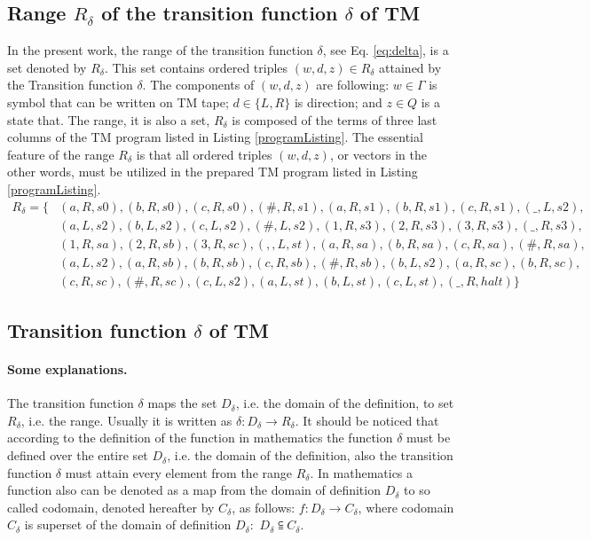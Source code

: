 \documentclass[12pt, a4paper, bibliography=totocnumbered]{report}
\begin{document}
	\subsection{Range $ R_{\delta} $ of the transition function $ \delta $ of TM}
	In the present work, the range of the transition function $ \delta $, see Eq. \ref{eq:delta}, is a set denoted by $ R_{\delta} $. This set contains ordered triples $ (w, d, z) \in R_{\delta} $ attained by the Transition function $ \delta $. The components of $ (w, d, z) $ are following: $ w \in \Gamma $ is symbol that can be written on TM tape; $ d \in \{L, R\} $ is direction; and $ z \in Q $ is a state that.
	The range, it is also a set, $ R_{\delta} $ is composed of the terms of three last columns of the TM program listed in Listing \ref{programListing}. The essential feature of the range $ R_{\delta} $ is that all ordered triples $ (w, d, z) $, or vectors in the other words, must be utilized in the prepared TM program listed in Listing \ref{programListing}.
	\begin{equation}
	\label{eq:range}
	\begin{aligned}
	R_{\delta} = \{ & (a, R, s0), (b, R, s0), (c, R, s0), (\#, R, s1), (a, R, s1), (b, R, s1), (c, R, s1), (\_, L, s2), \\
		   & (a, L, s2), (b, L, s2), (c, L, s2), (\#, L, s2), (1, R, s3), (2, R, s3), (3, R, s3), (\_, R, s3), \\
		   & (1, R, sa), (2, R, sb), (3, R, sc), (,, L, st), (a, R, sa), (b, R, sa), (c, R, sa), (\#, R, sa),  \\
		   & (a, L, s2), (a, R, sb), (b, R, sb), (c, R, sb), (\#, R, sb), (b, L, s2), (a, R, sc), (b, R, sc),  \\
		   & (c, R, sc), (\#, R, sc), (c, L, s2), (a, L, st), (b, L, st), (c, L, st), (\_, R, halt) \}
	\end{aligned}
	\end{equation}
	
	
	\subsection{Transition function $ \delta $ of TM}
	\paragraph{Some explanations.} The transition function $ \delta $ maps the set $ D_{\delta} $, i.e. the domain of the definition, to set $ R_{\delta} $, i.e. the range. Usually it is written as $ \delta: D_{\delta} \to R_{\delta} $.  It should be noticed that according to the definition of the function in mathematics the function $ \delta $ must be defined over the entire set $ D_{\delta} $, i.e. the domain of the definition, also the transition function $ \delta $ must attain every element from the range $ R_{\delta} $. In mathematics a function also can be denoted as a map from the domain of definition $ D_{\delta} $ to so called codomain, denoted hereafter by $ C_{\delta} $, as follows: $ f: D_{\delta} \to C_{\delta} $, where codomain $ C_{\delta} $ is superset of the domain of definition $ D_{\delta}: $ $ D_{\delta} \subseteqq C_{\delta} $.
	
\end{document}
